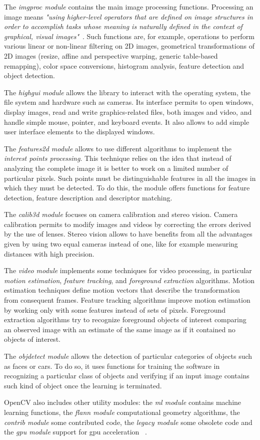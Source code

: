	The \emph{imgproc module} contains the main image processing functions. Processing an image means \emph{"using higher-level operators that are defined on image structures in order to accomplish tasks whose meaning is naturally defined in the context of graphical, visual images"}~\cite[128]{bradski2008learning}.
	Such functions are, for example, operations to perform various linear or non-linear filtering on 2D images, geometrical transformations of 2D images (resize, affine and perspective warping, generic table-based remapping), color space conversions, histogram analysis, feature detection and object detection.
	
	The \emph{highgui module} allows the library to interact with the operating system, the file system and hardware such as cameras. Its interface permits to open windows, display images, read and write graphics-related files, both images and video, and handle simple mouse, pointer, and keyboard events. It also allows to add simple user interface elements to the displayed windows.   

	The \emph{features2d module} allows to use different algorithms to implement the \emph{interest points processing}. This technique relies on the idea that instead of analyzing the complete image it is better to work on a limited number of particular pixels. Such points must be distinguishable features in all the images in which they must be detected. 
	To do this, the module offers functions for feature detection, feature description and descriptor matching.

	The \emph{calib3d module} focuses on camera calibration and stereo vision. Camera calibration permits to modify images and videos by correcting the errors derived by the use of lenses. Stereo vision allows to have benefits from all the advantages given by using two equal cameras instead of one, like for example measuring distances with high precision.

	The \emph{video module} implements some techniques for video processing, in particular \emph{motion estimation}, \emph{feature tracking}, and \emph{foreground extraction} algorithms. Motion estimation techniques define motion vectors that describe the transformation from consequent frames. Feature tracking algorithms improve motion estimation by working only with some features instead of sets of pixels. Foreground extraction algorithms try to recognize foreground objects of interest comparing an observed image with an estimate of the same image as if it contained no objects of interest. 

	 The \emph{objdetect module} allows the detection of particular categories of objects such as faces or cars. To do so, it uses functions for training the software in recognizing a particular class of objects and verifying if an input image contains such kind of object once the learning is terminated. 

	\mbox{OpenCV} also includes other utility modules: the \emph{ml module} contains machine learning functions, the \emph{flann module} computational geometry algorithms, the \emph{contrib module} some contributed code, the \emph{legacy module} some obsolete code and the \emph{gpu module} support for gpu acceleration ~\cite{laganiere2011opencv,OpenCVDoc,bradski2008learning}.


